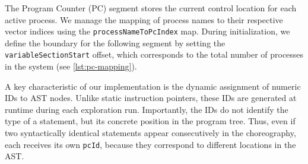 The Program Counter (PC) segment stores the current control location for each active process. We manage the mapping of process names to their respective vector indices using the  \texttt{process\-Name\-To\-Pc\-Index} map. During initialization, we define the boundary for the following segment by setting the \texttt{variable\-Section\-Start} offset, which corresponds to the total number of processes in the system (see \cref{lst:pc-mapping}). 
\begin{listing}[h]
\caption{Initialization of the Program Counter mapping}
\label{lst:pc-mapping}
\end{listing}

A key characteristic of our implementation is the dynamic assignment of numeric IDs to AST nodes. Unlike static instruction pointers, these IDs are generated at runtime during each exploration run. Importantly, the IDs do not identify the type of a statement, but its concrete position in the program tree. Thus, even if two syntactically identical statements appear consecutively in the choreography, each receives its own \texttt{pcId}, because they correspond to different locations in the AST.

